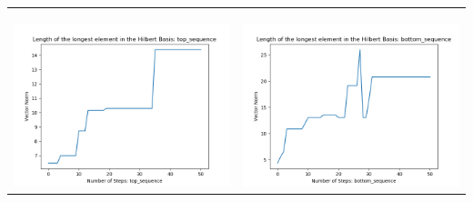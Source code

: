 \documentclass[10pt]{article}
\begin{document}
\begin{tabular}{c|c}
\begin{minipage}{.45\textwidth}
\end{minipage} \\ \\
\hline \\
\begin{minipage}{.45\textwidth}
\includegraphics[width=\textwidth]{"DATA/5d/6 generators 2 bound C alternating/top_sequence LENGTH"}
\end{minipage} &
\begin{minipage}{.45\textwidth}
\includegraphics[width=\textwidth]{"DATA/5d/6 generators 2 bound C alternating/bottom_sequence LENGTH"}
\end{minipage}
\end{tabular}
\end{document}

